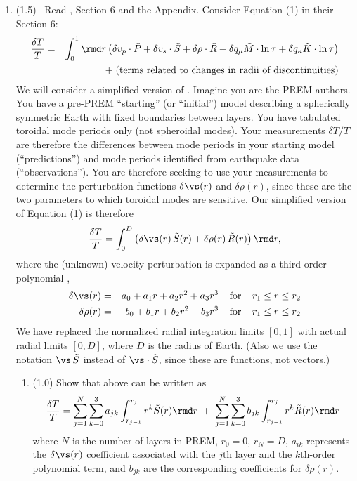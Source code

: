 \documentclass[11pt,titlepage,fleqn]{article}
\begin{document}
\begin{enumerate}
\item (1.5) \ptag\ Read \citet{PREM}, Section 6 and the Appendix. Consider Equation (1) in their Section 6:
%
\begin{eqnarray}
\frac{\delta T}{T} &=& \int_0^1 \rmd r \left(
\delta v_p \cdot \tilde{P} + 
\delta v_s \cdot \tilde{S} +
\delta\rho \cdot \tilde{R} +
\delta q_\mu \tilde{M} \cdot \ln\tau +
\delta q_\kappa \tilde{K} \cdot \ln\tau
\right)
\nonumber \\
&& + \; \text{(terms related to changes in radii of discontinuities)}
\label{dTprem}
\end{eqnarray}
%
We will consider a simplified version of .
Imagine you are the PREM authors. You have a pre-PREM ``starting'' (or ``initial'') model describing a spherically symmetric Earth with fixed boundaries between layers. You have tabulated toroidal mode periods only (not spheroidal modes). Your measurements $\delta T/T$ are therefore the differences between mode periods in your starting model (``predictions'') and mode periods identified from earthquake data (``observations''). You are therefore seeking to use your measurements to determine the perturbation functions $\delta\vs(r)$ and $\delta\rho(r)$, since these are the two parameters to which toroidal modes are sensitive. Our simplified version of Equation (1) is therefore
%
\begin{equation}
\frac{\delta T}{T} = \int_0^D \left(\delta\vs(r) \, \tilde{S}(r) + \delta\rho(r) \, \tilde{R}(r)\right) \rmd r,
\label{dT1}
\end{equation}
%
where the (unknown) velocity perturbation is expanded as a third-order polynomial \citep[][p.~307]{PREM},
%
\begin{eqnarray}
\delta\vs(r) &=& a_0 + a_1 r + a_2 r^2 + a_3 r^3
\;\;\;\;{\rm for}\;\;\;\; r_1 \le r \le r_2
\label{dvs}
\\
\delta\rho(r) &=& b_0 + b_1 r + b_2 r^2 + b_3 r^3
\;\;\;\;{\rm for}\;\;\;\; r_1 \le r \le r_2
\label{drho}
\end{eqnarray}
%
We have replaced the normalized radial integration limits $[0,1]$ with actual radial limits $[0,D]$, where $D$ is the radius of Earth. (Also we use the notation $\vs\,\tilde{S}$ instead of $\vs \cdot \tilde{S}$, since these are functions, not vectors.)

\begin{enumerate}
\item (1.0) Show that  above can be written as
%
\begin{equation}
\frac{\delta T}{T} = \sum_{j=1}^N \sum_{k=0}^3 a_{jk} \int_{r_{j-1}}^{r_j} r^{k} \tilde{S}(r) \rmd r
\;+\; \sum_{j=1}^N \sum_{k=0}^3 b_{jk} \int_{r_{j-1}}^{r_j} r^{k} \tilde{R}(r) \rmd r
\label{dT2}
\end{equation}
%
where $N$ is the number of layers in PREM, $r_0 = 0$, $r_N = D$, $a_{ik}$ represents the $\delta\vs(r)$ coefficient associated with the $j$th layer and the $k$th-order polynomial term, and $b_{jk}$ are the corresponding coefficients for $\delta\rho(r)$.


\end{enumerate}
\end{enumerate}
\end{document}
